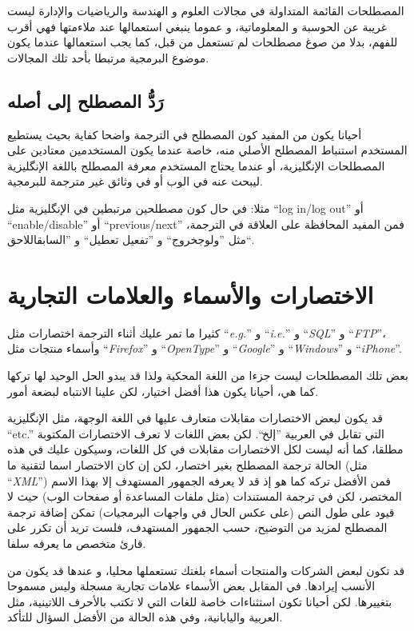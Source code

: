 المصطلحات القائمة المتداولة في مجالات العلوم و الهندسة والرياضيات
والإدارة ليست غريبة عن الحوسبة و المعلوماتية، و عموما ينبغي استعمالها
عند ملاءمتها فهي أقرب للفهم، بدلا من صوغ مصطلحات لم تستعمل من قبل، كما
يجب استعمالها عندما يكون موضوع البرمجية مرتبطا بأحد تلك المجالات.

\subsection{رَدُّ المصطلح إلى أصله}
أحيانا يكون من المفيد كون المصطلح في الترجمة واضحا كفاية بحيث يستطيع
المستخدم استنباط المصطلح الأصلي منه، خاصة عندما يكون المستخدمين معتادين
على المصطلحات الإنگليزية، أو عندما يحتاج المستخدم معرفة المصطلح باللغة
الإنگليزية ليبحث عنه في الوب أو في وثائق غير مترجمة للبرمجية.

مثلا: في حال كون مصطلحين مرتبطين في الإنگليزية مثل “log in/log out” أو
“enable/disable” أو “previous/next” فمن المفيد المحافظة على العلاقة في
الترجمة، مثل ”ولوج خروج“ و ”تفعيل
تعطيل“ و ”السابق اللاحق“.

\section[ref:37296725]{الاختصارات والأسماء والعلامات التجارية}
كثيرا ما تمر عليك أثناء الترجمة
اختصارات مثل “{\it e.g.}” و “{\it i.e.}” و “{\it SQL}” و “{\it FTP}”،
وأسماء منتجات مثل “{\it Firefox}” و “{\it OpenType}” و “{\it Google}” و
“{\it Windows}” و “{\it iPhone}”.

بعض تلك المصطلحات ليست جزءا من اللغة المحكية ولذا قد يبدو الحل الوحيد
لها تركها كما هي، أحيانا يكون هذا أفضل اختيار، لكن علينا الانتباه لبضعة
أمور.

قد يكون لبعض الاختصارات مقابلات متعارف عليها في اللغة الوجهة، مثل
الإنگليزية “etc.” التي تقابل في العربية ”إلخ“. لكن بعض اللغات لا تعرف
الاختصارات المكتوبة مطلقا، كما أنه ليست لكل الاختصارات مقابلات في كل
اللغات، وسيكون عليك في هذه الحالة ترجمة المصطلح بغير اختصار، لكن إن كان
الاختصار اسما لتقنية ما (مثل “{\it XML}”) فمن الأفضل تركه كما هو إذ قد
لا يعرفه الجمهور المستهدف إلا بهذا الاسم المختصر، لكن في ترجمة
المستندات (مثل ملفات المساعدة أو صفحات الوب) حيث لا قيود على طول النص
(على عكس الحال في واجهات البرمجيات) تمكن إضافة ترجمة المصطلح لمزيد من
التوضيح، حسب الجمهور المستهدف، فلست تريد أن تكرر على قارئ متخصص ما
يعرفه سلفا.

قد تكون لبعض الشركات والمنتجات أسماء بلغتك تستعملها محليا، و عندها قد
يكون من الأنسب إيرادها. في المقابل بعض الأسماء علامات تجارية مسجلة وليس
مسموحا بتغييرها. لكن أحيانا تكون استثناءات خاصة للغات التي لا تكتب
بالأحرف اللاتينية، مثل العربية واليابانية، وفي هذه الحالة من الأفضل
السؤال للتأكد.

